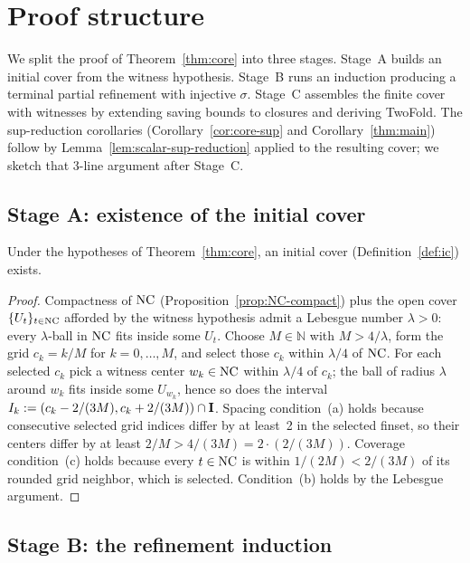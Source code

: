 \section{Proof structure}
\label{sec:proof}

We split the proof of Theorem~\ref{thm:core} into three stages.
Stage~A builds an initial cover from the witness hypothesis.
Stage~B runs an induction producing a terminal partial
refinement with injective $\sigma$. Stage~C assembles the finite
cover with witnesses by extending saving bounds to closures and
deriving TwoFold. The sup-reduction corollaries
(Corollary~\ref{cor:core-sup} and Corollary~\ref{thm:main})
follow by Lemma~\ref{lem:scalar-sup-reduction} applied to the
resulting cover; we sketch that 3-line argument after Stage~C.

\subsection{Stage A: existence of the initial cover}

\begin{proposition}
\label{prop:exists-ic}
Under the hypotheses of Theorem~\ref{thm:core}, an initial cover
(Definition~\ref{def:ic}) exists.
\end{proposition}

\begin{proof}
Compactness of $\mathrm{NC}$ (Proposition~\ref{prop:NC-compact}) plus the
open cover $\{U_t\}_{t \in \mathrm{NC}}$ afforded by the witness
hypothesis admit a Lebesgue number $\lambda > 0$: every
$\lambda$-ball in $\mathrm{NC}$ fits inside some $U_t$. Choose
$M \in \mathbb{N}$ with $M > 4/\lambda$, form the grid
$c_k = k/M$ for $k = 0, \ldots, M$, and select those $c_k$ within
$\lambda/4$ of $\mathrm{NC}$. For each selected $c_k$ pick a witness
center $w_k \in \mathrm{NC}$ within $\lambda/4$ of $c_k$; the ball of
radius $\lambda$ around $w_k$ fits inside some $U_{w_k}$, hence
so does the interval
$I_k := (c_k - 2/(3M), c_k + 2/(3M)) \cap \mathbf{I}$. Spacing
condition~(a) holds because consecutive selected grid indices
differ by at least~2 in the selected finset, so their centers
differ by at least $2/M > 4/(3M) = 2 \cdot (2/(3M))$. Coverage
condition~(c) holds because every $t \in \mathrm{NC}$ is within
$1/(2M) < 2/(3M)$ of its rounded grid neighbor, which is
selected. Condition~(b) holds by the Lebesgue argument.
\end{proof}

\subsection{Stage B: the refinement induction}

